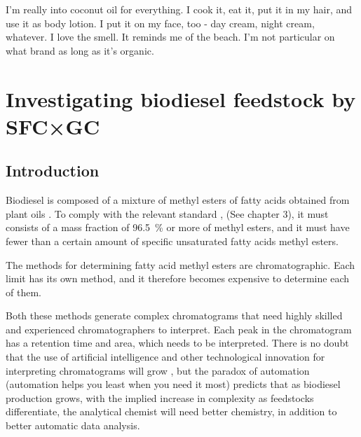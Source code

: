 
\begin{savequote}[45mm] I'm really into coconut oil for everything. I cook it,
eat it, put it in my hair, and use it as body lotion. I put it on my face, too -
day cream, night cream, whatever. I love the smell. It reminds me of the beach.
I'm not particular on what brand as long as it's organic.

\end{savequote}

\chapter{Investigating biodiesel feedstock by SFC×GC} %

\label{Chapter6} %


\section{Introduction}

Biodiesel is composed of a mixture of methyl esters of fatty acids obtained from
plant oils \autocite{SANS1935}. To comply with the relevant standard
\autocite{SANS1935}, (See chapter 3), it must consists of a mass fraction of
\SI{96.5}{\percent} or more of methyl esters, and it must have fewer than a
certain amount of specific unsaturated fatty acids methyl esters.

The methods for determining fatty acid methyl esters are chromatographic. Each
limit has its own method, and it therefore becomes expensive to determine each
of them.
 
Both these methods generate complex chromatograms that need highly skilled and
experienced chromatographers to interpret. Each peak in the chromatogram has a
retention time and area, which needs to be interpreted. There is no doubt that
the use of artificial intelligence and other technological innovation for
interpreting chromatograms will grow , but the paradox of automation (automation helps you least when
you need it most)
predicts that as biodiesel production grows, with the implied increase in
complexity as feedstocks differentiate, the analytical chemist will need better
chemistry, in addition to better automatic data analysis.

